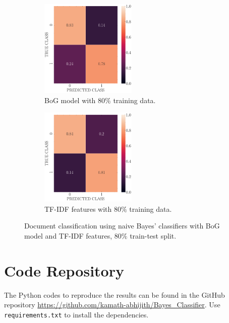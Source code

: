 \documentclass[12pt, a4 paper]{article}
\begin{document}
\begin{figure}[!htbp]
\centering
    \begin{subfigure}[!htbp]{0.24\textwidth}
       \centering
       \includegraphics[width=1.8in]{../results/ex4/conf_mtx_bog_train_test_split_0.2.pdf}
       \caption{BoG model with $80\%$ training data.}
       \label{fig:bog_80}
    \end{subfigure}
\quad \quad
    \begin{subfigure}[!htbp]{0.24\textwidth}
       \centering
       \includegraphics[width=1.8in]{../results/ex4/conf_mtx_tfidf_train_test_split_0.2.pdf}
       \caption{TF-IDF features with $80\%$ training data.}
       \label{fig:tfidf_80}
    \end{subfigure}
\caption{Document classification using naive Bayes' classifiers with BoG model and TF-IDF features, $80\%$ train-test split.}
\label{fig:ex4_80}
\end{figure}



\section{Code Repository}
The Python codes to reproduce the results can be found in the GitHub repository \url{https://github.com/kamath-abhijith/Bayes_Classifier}. Use \texttt{requirements.txt} to install the dependencies.
\end{document}
